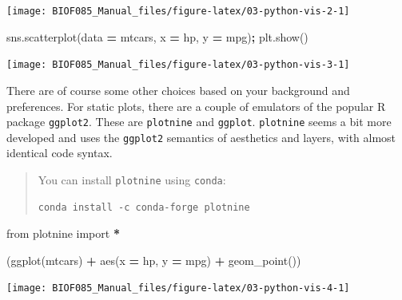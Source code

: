 \documentclass[
  letterpaper,
]{scrbook}
\newenvironment{Shaded}{\begin{snugshade}}{\end{snugshade}}
\newcommand{\ImportTok}[1]{#1}
\newcommand{\NormalTok}[1]{#1}
\newcommand{\OperatorTok}[1]{\textcolor[rgb]{0.81,0.36,0.00}{\textbf{#1}}}
\newcommand{\StringTok}[1]{\textcolor[rgb]{0.31,0.60,0.02}{#1}}
\begin{document}
\begin{center}\texttt{[image: BIOF085\_Manual\_files/figure-latex/03-python-vis-2-1]} \end{center}

\begin{Shaded}
\begin{Highlighting}[]
\NormalTok{sns.scatterplot(data }\OperatorTok{=}\NormalTok{ mtcars, x }\OperatorTok{=} \StringTok{\textquotesingle{}hp\textquotesingle{}}\NormalTok{, y }\OperatorTok{=} \StringTok{\textquotesingle{}mpg\textquotesingle{}}\NormalTok{)}\OperatorTok{;}
\NormalTok{plt.show()}
\end{Highlighting}
\end{Shaded}

\begin{center}\texttt{[image: BIOF085\_Manual\_files/figure-latex/03-python-vis-3-1]} \end{center}

There are of course some other choices based on your background and preferences. For static plots, there are a couple of emulators of the popular R package \texttt{ggplot2}. These are \texttt{plotnine} and \texttt{ggplot}. \texttt{plotnine} seems a bit more developed and uses the \texttt{ggplot2} semantics of aesthetics and layers, with almost identical code syntax.

\begin{quote}
You can install \texttt{plotnine} using \texttt{conda}:

\begin{verbatim}
conda install -c conda-forge plotnine
\end{verbatim}
\end{quote}

\begin{Shaded}
\begin{Highlighting}[]
\ImportTok{from}\NormalTok{ plotnine }\ImportTok{import} \OperatorTok{*}

\NormalTok{(ggplot(mtcars) }\OperatorTok{+} 
\NormalTok{  aes(x }\OperatorTok{=} \StringTok{\textquotesingle{}hp\textquotesingle{}}\NormalTok{, y }\OperatorTok{=} \StringTok{\textquotesingle{}mpg\textquotesingle{}}\NormalTok{) }\OperatorTok{+}
\NormalTok{  geom\_point())}
\end{Highlighting}
\end{Shaded}

\begin{center}\texttt{[image: BIOF085\_Manual\_files/figure-latex/03-python-vis-4-1]} \end{center}
\end{document}

